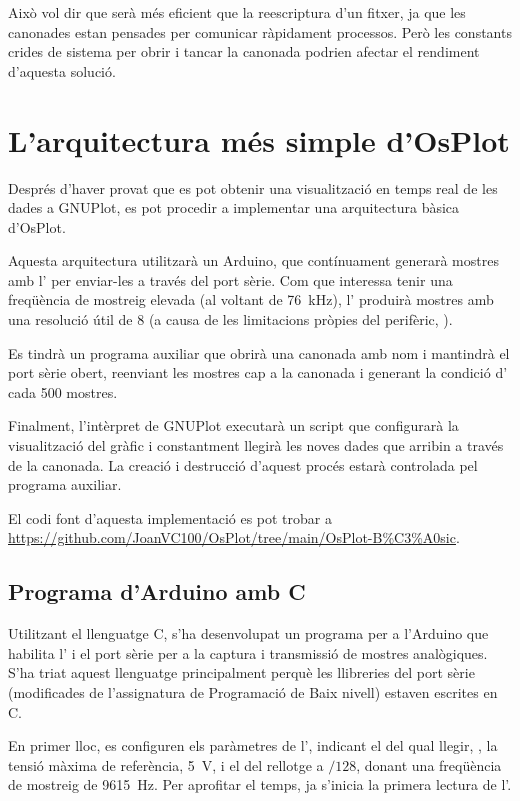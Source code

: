 \documentclass{tfgitic}[2023/07/07]
\begin{document}
Això vol dir que serà més eficient que la reescriptura d'un fitxer, ja
que les canonades estan pensades per comunicar ràpidament
processos. Però les constants crides de sistema per obrir i tancar la
canonada podrien afectar el rendiment d'aquesta solució.

\section{L'arquitectura més simple d'OsPlot}

Després d'haver provat que es pot obtenir una visualització en temps
real de les dades a GNUPlot, es pot procedir a implementar una
arquitectura bàsica d'OsPlot.

Aquesta arquitectura utilitzarà un Arduino, que contínuament generarà
mostres amb l' per enviar-les a través del port sèrie. Com
que interessa tenir una freqüència de mostreig elevada (al voltant de
\SI{76}{\kHz}), l' produirà mostres amb una resolució útil
de \SI{8}{\bits} (a causa de les limitacions pròpies del perifèric,
\cite{analisi-adc}).

Es tindrà un programa auxiliar que obrirà una canonada amb nom i
mantindrà el port sèrie obert, reenviant les mostres cap a la canonada
i generant la condició d' cada \num{500} mostres.

Finalment, l'intèrpret de GNUPlot executarà un script que configurarà
la visualització del gràfic i constantment llegirà les noves dades que
arribin a través de la canonada. La creació i destrucció d'aquest
procés estarà controlada pel programa auxiliar.

El codi font d'aquesta implementació es pot trobar a
\url{https://github.com/JoanVC100/OsPlot/tree/main/OsPlot-B%C3%A0sic}.

\subsection{Programa d'Arduino amb C}
\label{programa-arduino-c}

Utilitzant el llenguatge C, s'ha desenvolupat un programa per a
l'Arduino que habilita l' i el port sèrie per a la captura i
transmissió de mostres analògiques. S'ha triat aquest llenguatge
principalment perquè les llibreries del port sèrie (modificades de
l'assignatura de Programació de Baix nivell) estaven escrites en C.

En primer lloc, es configuren els paràmetres de l', indicant
el  del qual llegir, , la tensió màxima de
referència, \SI{5}{\V}, i el  del rellotge a $/128$,
donant una freqüència de mostreig de \SI{9615}{\Hz}. Per aprofitar el
temps, ja s'inicia la primera lectura de l'.
\end{document}
